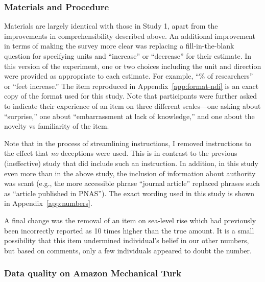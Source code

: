 
\subsubsection{Materials and Procedure}

Materials are largely identical with those in Study 1, apart from the
improvements in comprehensibility described above. An additional improvement in
terms of making the survey more clear was replacing a fill-in-the-blank question
for specifying units and “increase” or “decrease” for their estimate. In this
version of the experiment, one or two choices including the unit and direction
were provided as appropriate to each estimate. For example, “\% of researchers”
or “feet increase.” The item reproduced in Appendix~\ref{app:format-ndi} is an
exact copy of the format used for this study.  Note that participants were
further asked to indicate their experience of an item on three different
scales---one asking about “surprise,” one about “embarrassment at lack of
knowledge,” and one about the novelty vs familiarity of the item.

Note that in the process of streamlining instructions, I removed instructions to
the effect that \emph{no} deceptions were used. This is in contrast to the previous
(ineffective) study that did include such an instruction.  In addition, in this
study even more than in the above study, the inclusion of information about
authority was scant (e.g., the more accessible phrase “journal article” replaced
phrases such as “article published in PNAS”). The exact wording used in this
study is shown in Appendix~\ref{app:numbers}.

A final change was the removal of an item on sea-level rise which had previously
been incorrectly reported as 10 times higher than the true amount. It is a small
possibility that this item undermined individual's belief in our other numbers,
but based on comments, only a few individuals appeared to doubt the number.

\subsubsection{Data quality on Amazon Mechanical Turk}
\label{sec:mturk-problems}

